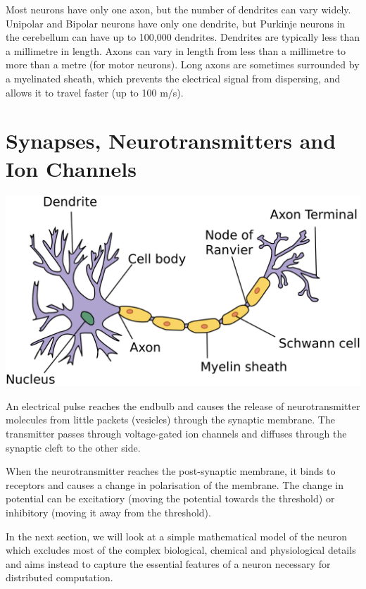 \documentclass[11pt]{article}
\begin{document}
Most neurons have only one axon, but the number of dendrites can vary widely.
Unipolar and Bipolar neurons have only one dendrite, but Purkinje neurons in the cerebellum can have up to 100,000 dendrites.
Dendrites are typically less than a millimetre in length.
Axons can vary in length from less than a millimetre to more than a metre (for motor neurons).
Long axons are sometimes surrounded by a myelinated sheath, which prevents the electrical signal from dispersing, and allows it to travel faster (up to 100 m/s).

\section{Synapses, Neurotransmitters and Ion Channels}\label{sec:synapses-neurotransmitters-and-ion-channels}
\includegraphics[width=\textwidth,height=\textheight,keepaspectratio]{img_8}

An electrical pulse reaches the endbulb and causes the release of neurotransmitter molecules from little packets (vesicles) through the synaptic membrane.
The transmitter passes through voltage-gated ion channels and diffuses through the synaptic cleft to the other side.

When the neurotransmitter reaches the post-synaptic membrane, it binds to receptors and causes a change in polarisation of the membrane.
The change in potential can be excitatiory (moving the potential towards the threshold) or inhibitory (moving it away from the threshold).

In the next section, we will look at a simple mathematical model of the neuron which excludes most of the complex biological, chemical and physiological details and aims instead to capture the essential features of a neuron necessary for distributed computation.

\pagebreak
\end{document}
